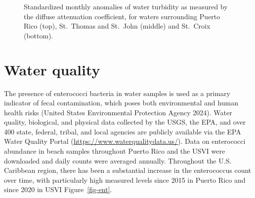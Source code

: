 \documentclass[
  letterpaper,
  oneside,
  open=any]{scrbook}
\begin{document}
\begin{figure}


\caption{\label{fig-turb}Standardized monthly anomalies of water
turbidity as measured by the diffuse attenuation coefficient, for waters
surrounding Puerto Rico (top), St.~Thomas and St.~John (middle) and
St.~Croix (bottom).}

\end{figure}%

\section{Water quality}\label{water-quality}

The presence of enterococci bacteria in water samples is used as a
primary indicator of fecal contamination, which poses both environmental
and human health risks (United States Environmental Protection Agency
2024). Water quality, biological, and physical data collected by the
USGS, the EPA, and over 400 state, federal, tribal, and local agencies
are publicly available via the EPA Water Quality Portal
(\url{https://www.waterqualitydata.us/}). Data on enterococci abundance
in beach samples throughout Puerto Rico and the USVI were downloaded and
daily counts were averaged annually. Throughout the U.S. Caribbean
region, there has been a substantial increase in the enterococcus count
over time, with particularly high measured levels since 2015 in Puerto
Rico and since 2020 in USVI Figure~\ref{fig-ent}.
\end{document}
